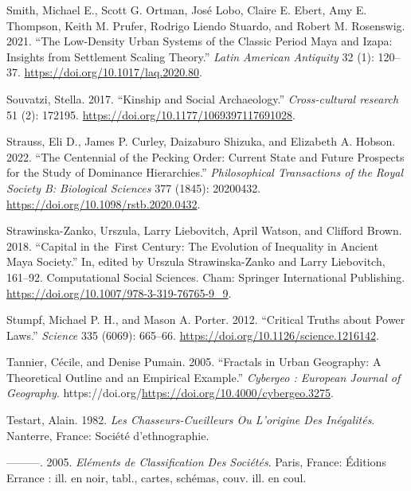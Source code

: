 \documentclass[
  12pt,
  a4paper, twoside]{book}
\newlength{\cslhangindent}
\newlength{\cslentryspacingunit} %
\newenvironment{CSLReferences}[2] %
 {%
  \setlength{\parindent}{0pt}
  \ifodd #1
  \let\oldpar\par
  \def\par{\hangindent=\cslhangindent\oldpar}
  \fi
  \setlength{\parskip}{#2\cslentryspacingunit}
 }%
 {}
\begin{document}
\begin{CSLReferences}{1}{0}
\leavevmode{}%
Smith, Michael E., Scott G. Ortman, José Lobo, Claire E. Ebert, Amy E. Thompson, Keith M. Prufer, Rodrigo Liendo Stuardo, and Robert M. Rosenswig. 2021. {``The Low-Density Urban Systems of the Classic Period Maya and Izapa: Insights from Settlement Scaling Theory.''} \emph{Latin American Antiquity} 32 (1): 120--37. \url{https://doi.org/10.1017/laq.2020.80}.

\leavevmode{}%
Souvatzi, Stella. 2017. {``Kinship and Social Archaeology.''} \emph{Cross-cultural research} 51 (2): 172195. \url{https://doi.org/10.1177/1069397117691028}.

\leavevmode{}%
Strauss, Eli D., James P. Curley, Daizaburo Shizuka, and Elizabeth A. Hobson. 2022. {``The Centennial of the Pecking Order: Current State and Future Prospects for the Study of Dominance Hierarchies.''} \emph{Philosophical Transactions of the Royal Society B: Biological Sciences} 377 (1845): 20200432. \url{https://doi.org/10.1098/rstb.2020.0432}.

\leavevmode{}%
Strawinska-Zanko, Urszula, Larry Liebovitch, April Watson, and Clifford Brown. 2018. {``Capital in the~First Century: The Evolution of Inequality in Ancient Maya Society.''} In, edited by Urszula Strawinska-Zanko and Larry Liebovitch, 161--92. Computational Social Sciences. Cham: Springer International Publishing. \url{https://doi.org/10.1007/978-3-319-76765-9_9}.

\leavevmode{}%
Stumpf, Michael P. H., and Mason A. Porter. 2012. {``Critical Truths about Power Laws.''} \emph{Science} 335 (6069): 665--66. \url{https://doi.org/10.1126/science.1216142}.

\leavevmode{}%
Tannier, Cécile, and Denise Pumain. 2005. {``Fractals in Urban Geography: A Theoretical Outline and an Empirical Example.''} \emph{Cybergeo : European Journal of Geography}. https://doi.org/\url{https://doi.org/10.4000/cybergeo.3275}.

\leavevmode{}%
Testart, Alain. 1982. \emph{Les Chasseurs-Cueilleurs Ou L'origine Des Inégalités}. Nanterre, France: Société d'ethnographie.

\leavevmode{}%
---------. 2005. \emph{Eléments de Classification Des Sociétés}. Paris, France: Éditions Errance : ill. en noir, tabl., cartes, schémas, couv. ill. en coul.


\end{CSLReferences}
\end{document}
